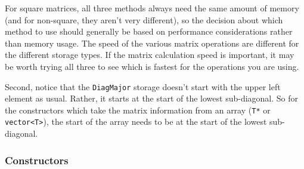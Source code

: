 \documentclass[twoside,letterpaper,11pt]{article}
\renewcommand{\tt}[1]{{\texttt {#1}}}
\begin{document}
For square matrices, all three methods always need the same amount of memory 
(and for non-square, they aren't very different), so the 
decision about which method to use should generally be based on performance 
considerations rather than memory usage.
The speed of the various matrix operations are different for the different storage 
types.  If the matrix calculation speed is important, it may be worth trying 
all three to see which is fastest for the operations you are using.

Second, notice that the \tt{DiagMajor} storage doesn't start with the 
upper left element as usual.
Rather, it starts at the start of the lowest sub-diagonal.  
So for the constructors which 
take the matrix information from an array (\tt{T*} or \tt{vector<T>}), 
the start of the array needs to be at the start of the lowest sub-diagonal.  

\subsubsection{Constructors}
\end{document}
